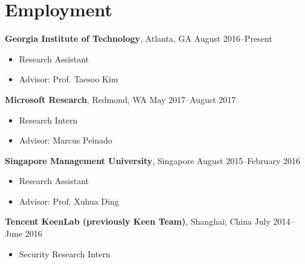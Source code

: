 \section*{Employment}

\begin{description}
\item {\bf Georgia Institute of Technology}, Atlanta, GA
\dotfill August 2016--Present
  \begin{itemize}
  \item Research Assistant
  \item Advisor: Prof. Taesoo Kim
  \end{itemize}
  
\item {\bf Microsoft Research}, Redmond, WA \dotfill May 2017--August 2017
  \begin{itemize}
  \item Research Intern
  \item Advisor: Marcus Peinado
  \end{itemize}

\item {\bf Singapore Management University}, Singapore \dotfill August 2015--February 2016
  \begin{itemize}
  \item Research Assistant
  \item Advisor: Prof. Xuhua Ding
  \end{itemize}

\item {\bf Tencent KeenLab (previously Keen Team)}, Shanghai, China \dotfill July 2014--June 2016
	\begin{itemize}
	\item Security Research Intern
	\end{itemize}
\end{description}
